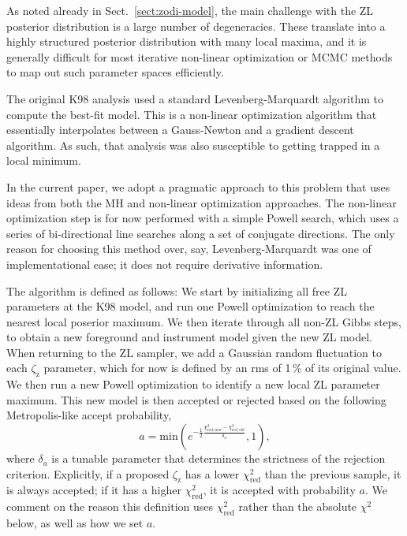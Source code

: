 \documentclass[twocolumn]{aa}
\begin{document}
As noted already in Sect.~\ref{sect:zodi-model}, the main challenge
with the ZL posterior distribution is a large number of
degeneracies. These translate into a highly structured posterior
distribution with many local maxima, and it is generally difficult for
most iterative non-linear optimization or MCMC methods to map out such
parameter spaces efficiently.

The original K98 analysis used a standard Levenberg-Marquardt
algorithm to compute the best-fit model. This is a non-linear
optimization algorithm that essentially interpolates between a
Gauss-Newton and a gradient descent algorithm. As such, that analysis
was also susceptible to getting trapped in a local minimum.

In the current paper, we adopt a pragmatic approach to this problem
that uses ideas from both the MH and non-linear optimization
approaches. The non-linear optimization step is for now performed with
a simple Powell search, which uses a series of bi-directional line
searches along a set of conjugate directions. The only reason for
choosing this method over, say, Levenberg-Marquardt was one of
implementational ease; it does not require derivative information.

The algorithm is defined as follows: We start by initializing all free
ZL parameters at the K98 model, and run one Powell optimization to
reach the nearest local poserior maximum. We then iterate through all
non-ZL Gibbs steps, to obtain a new foreground and instrument model
given the new ZL model. When returning to the ZL sampler, we add a
Gaussian random fluctuation to each $\zeta_{\mathrm{z}}$ parameter,
which for now is defined by an rms of 1\,\% of its original value. We
then run a new Powell optimization to identify a new local ZL
parameter maximum. This new model is then accepted or rejected based
on the following Metropolis-like accept probability,
\begin{equation}
a = \mathrm{min}\left(e^{-\frac{1}{2}\frac{\chi^2_{\mathrm{red,new}}-\chi^2_\mathrm{red,old}}{\delta_{a}}},1\right),
\label{eq:accept}
\end{equation}
where $\delta_a$ is a tunable parameter that determines the strictness
of the rejection criterion. Explicitly, if a proposed
$\zeta_{\mathrm{z}}$ has a lower $\chi_{\mathrm{red}}^2$ than the
previous sample, it is always accepted; if it has a higher
$\chi_{\mathrm{red}}^2$, it is accepted with probability $a$. We
comment on the reason this definition uses $\chi^2_{\mathrm{red}}$
rather than the absolute $\chi^2$ below, as well as how we set $a$.
\end{document}
